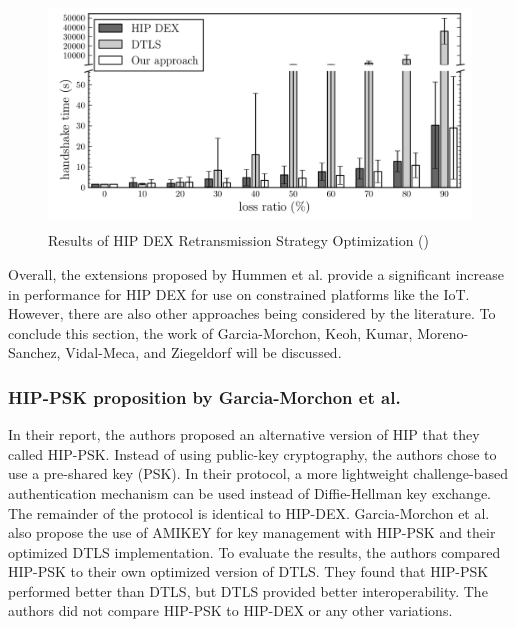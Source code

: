 \documentclass[letterpaper, 12pt]{article}
\begin{document}
\begin{flushleft}
\begin{figure}[H]
	\includegraphics[width=\linewidth,height=6cm,keepaspectratio]{figure7.png}
	\caption{Results of HIP DEX Retransmission Strategy Optimization (\cite{Hummen})}
	\label{fig:arch}
\end{figure}

Overall, the extensions proposed by Hummen et al. provide a significant increase in performance for HIP DEX for use on constrained platforms like the 
IoT. However, there are also other approaches being considered by the literature. To conclude this section, the work of Garcia-Morchon, Keoh, Kumar,
Moreno-Sanchez, Vidal-Meca, and Ziegeldorf will be discussed. 

\subsubsection*{HIP-PSK proposition by Garcia-Morchon et al.}
In their report, the authors proposed an alternative version of HIP that they called HIP-PSK. Instead of using public-key cryptography, the authors chose
to use a pre-shared key (PSK). In their protocol, a more lightweight challenge-based authentication mechanism can be used instead of Diffie-Hellman key
exchange. The remainder of the protocol is identical to HIP-DEX. Garcia-Morchon et al. also propose the use of AMIKEY for key management with HIP-PSK
and their optimized DTLS implementation. To evaluate the results, the authors compared HIP-PSK to their own optimized version of DTLS. They found that 
HIP-PSK performed better than DTLS, but DTLS provided better interoperability. The authors did not compare HIP-PSK to HIP-DEX or any other variations. 

\newpage
{}
\printbibliography
\end{flushleft}
\end{document}
